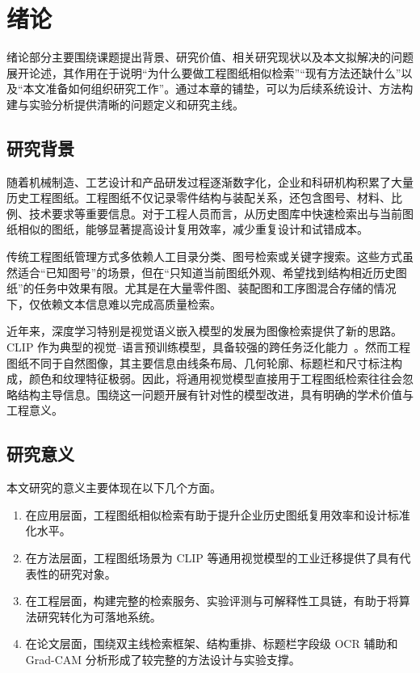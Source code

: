 \chapter{绪论}

绪论部分主要围绕课题提出背景、研究价值、相关研究现状以及本文拟解决的问题展开论述，其作用在于说明“为什么要做工程图纸相似检索”“现有方法还缺什么”以及“本文准备如何组织研究工作”。通过本章的铺垫，可以为后续系统设计、方法构建与实验分析提供清晰的问题定义和研究主线。

\section{研究背景}

随着机械制造、工艺设计和产品研发过程逐渐数字化，企业和科研机构积累了大量历史工程图纸。工程图纸不仅记录零件结构与装配关系，还包含图号、材料、比例、技术要求等重要信息。对于工程人员而言，从历史图库中快速检索出与当前图纸相似的图纸，能够显著提高设计复用效率，减少重复设计和试错成本。

传统工程图纸管理方式多依赖人工目录分类、图号检索或关键字搜索。这些方式虽然适合“已知图号”的场景，但在“只知道当前图纸外观、希望找到结构相近历史图纸”的任务中效果有限。尤其是在大量零件图、装配图和工序图混合存储的情况下，仅依赖文本信息难以完成高质量检索。

近年来，深度学习特别是视觉语义嵌入模型的发展为图像检索提供了新的思路。CLIP 作为典型的视觉--语言预训练模型，具备较强的跨任务泛化能力~\citep{radford2021clip}。然而工程图纸不同于自然图像，其主要信息由线条布局、几何轮廓、标题栏和尺寸标注构成，颜色和纹理特征极弱。因此，将通用视觉模型直接用于工程图纸检索往往会忽略结构主导信息。围绕这一问题开展有针对性的模型改进，具有明确的学术价值与工程意义。

\section{研究意义}

本文研究的意义主要体现在以下几个方面。

\begin{enumerate}
  \item 在应用层面，工程图纸相似检索有助于提升企业历史图纸复用效率和设计标准化水平。
  \item 在方法层面，工程图纸场景为 CLIP 等通用视觉模型的工业迁移提供了具有代表性的研究对象。
  \item 在工程层面，构建完整的检索服务、实验评测与可解释性工具链，有助于将算法研究转化为可落地系统。
  \item 在论文层面，围绕双主线检索框架、结构重排、标题栏字段级 OCR 辅助和 Grad-CAM 分析形成了较完整的方法设计与实验支撑。
\end{enumerate}

